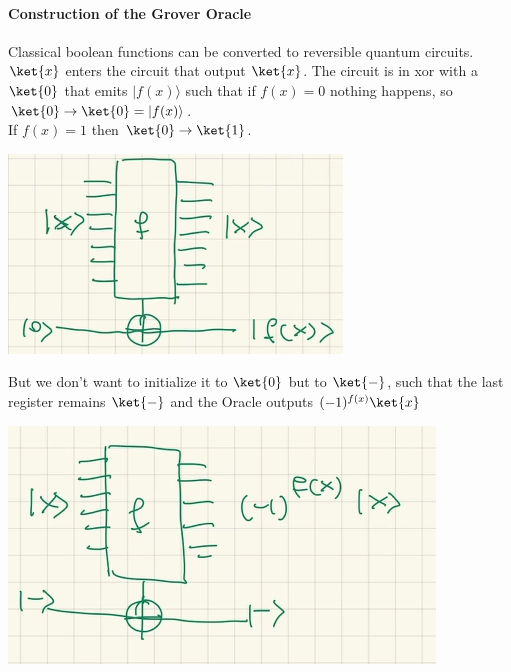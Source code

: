 \documentclass[10pt]{report}
\begin{document}
\paragraph{Construction of the Grover Oracle} Classical boolean functions can be converted to reversible quantum circuits.
$\ket{x}$ enters the circuit that output $\ket{x}$. The circuit is in xor with a $\ket{0}$ that emits $|f(x)\rangle$ such that if $f(x)=0$ nothing happens, so $\ket{0}\rightarrow\ket{0} = |f(x)\rangle$.\\
If $f(x) = 1$ then $\ket{0}\rightarrow\ket{1}$.
\begin{center}
	\includegraphics[scale=0.5]{30.png}
\end{center}
But we don't want to initialize it to $\ket{0}$ but to $\ket{-}$, such that the last register remains $\ket{-}$ and the Oracle outputs $(-1)^{f(x)}\ket{x}$
\begin{center}
	\includegraphics[scale=0.5]{31.png}
\end{center}
\end{document}
